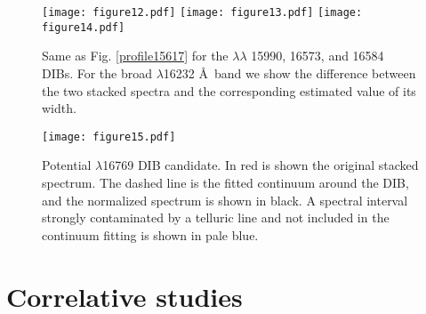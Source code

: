 \documentclass[printer]{aa} %
\begin{document}
\begin{figure}[!htb]
\centering
 \texttt{[image: figure12.pdf]}
 \texttt{[image: figure13.pdf]}
 \texttt{[image: figure14.pdf]}
  \caption{\label{profile15990} Same as Fig. \ref{profile15617} for the $\lambda\lambda$ 15990, 16573, and 16584 DIBs. For the broad $\lambda$16232 \AA\ band we show the difference between the two stacked spectra and the corresponding estimated value of its width.}
\end{figure}

\begin{figure}[!htb]
\centering
 \texttt{[image: figure15.pdf]}

\caption{\label{profile16769} Potential $\lambda$16769 DIB candidate. In red is shown the original stacked spectrum. The dashed line is the fitted continuum around the DIB, and the normalized spectrum is shown in black. A spectral interval strongly contaminated by a telluric line and not included in the continuum fitting is shown in pale blue.}
\end{figure}

\section{Correlative studies\label{correlstudies}}
\end{document}
